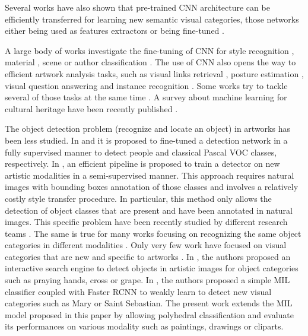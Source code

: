 \documentclass[preprint]{elsarticle}
\begin{document}
Several works have also shown that pre-trained CNN architecture can be efficiently transferred for learning new semantic visual categories, those networks either being used as features extractors \citep{crowley_search_2014,crowley_visual_2016} or being fine-tuned \citep{yin_object_2016,strezoski_omniart_2018,wilber_bam_2017}. 

A large body of works investigate the fine-tuning of CNN for style recognition \citep{lecoutre_recognizing_2017,mao_deepart_2017,elgammal_shape_2018}, material \citep{sabatelli_deep_2018}, scene \citep{florea_domain_2017} or author classification \citep{vannoord_learning_2017}.
The use of CNN also opens the way to efficient artwork analysis tasks, such as visual links retrieval \citep{seguin_visual_2016}, posture estimation \citep{jenicek_linking_2019}, visual question answering \citep{bongini_visual_2020} and instance recognition \citep{shen_discovering_2019,delchiaro_weblysupervised_2019}.  
Some works try to tackle several of those tasks at the same time
\citep{garcia_contextaware_2019,bianco_multitask_2019}. A survey about machine learning for cultural heritage have been recently published \citep{fiorucci_machine_2020}.

The object detection problem (recognize and locate an object) in artworks has been less studied.
In \citep{westlake_detecting_2016} and \citep{strezoski_omniart_2018} it is proposed to fine-tuned a detection network in a fully supervised manner to detect people and classical Pascal VOC classes, respectively.
In \citep{inoue_crossdomain_2018}, an efficient pipeline is proposed to train a detector on new artistic modalities in a semi-supervised manner. This approach requires natural images with bounding boxes annotation of those classes and involves a relatively costly style transfer procedure. In particular, this method only allows the detection of object classes that are present and have been annotated in natural images. This specific problem have been recently studied by different research teams \citep{saito_strongweak_2019,fu_deeply_2020}. The same is true for many works focusing on recognizing the same object categories in different modalities \citep{li_deeper_2017,wilber_bam_2017,thomas_artistic_2018}.
Only very few work have focused on visual categories that are new and specific to artworks \citep{lang_finding_2019,gonthier_weakly_2018}.
In \citep{lang_finding_2019}, the authors proposed an interactive search engine to detect objects in artistic images for  object categories such as praying hands, cross or grape.
In \citep{gonthier_weakly_2018}, the authors proposed a simple MIL classifier coupled with Faster RCNN \citep{ren_faster_2015} to weakly learn to detect new visual categories such as Mary or Saint Sebastian. The present work extends the MIL model proposed in this paper by allowing polyhedral classification and evaluate its performances on various modality such as paintings, drawings or cliparts. 
\end{document}
